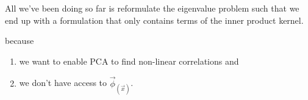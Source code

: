 \begin{frame}


All we've been doing so far is reformulate the eigenvalue problem such that we end up 
with a formulation that only contains terms of the inner product kernel.\\

\pause


because

\begin{enumerate}
\item we want to enable PCA to find non-linear correlations and
\item we don't have access to $\vec \phi_{(\vec x)}$.
\end{enumerate}

\end{frame}

